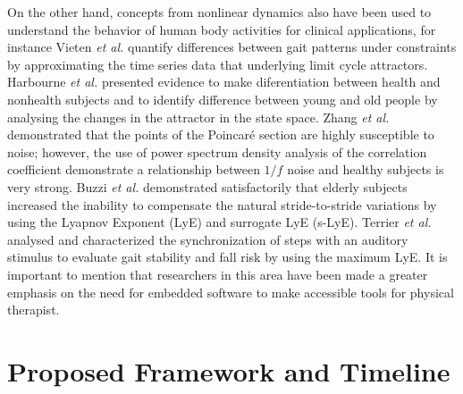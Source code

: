 \documentclass{sigchi}
\begin{document}
On the other hand, concepts from nonlinear dynamics also have been used to understand 
the behavior of human body activities for clinical applications, for instance
Vieten \emph{et al.} \cite{Vieten2013} quantify differences between gait patterns 
under constraints by approximating the time series data that underlying limit cycle 
attractors. 
Harbourne \emph{et al.} \cite{Harbourne2009} presented evidence 
to make diferentiation between health and nonhealth subjects and 
to identify difference between young and old people 
by analysing the changes in the attractor in the state space.
Zhang \textit{et al.} \cite{Zhang2010} demonstrated that the points of the 
Poincar\'e section are highly susceptible to noise; however, the use of power 
spectrum density analysis of the correlation coefficient demonstrate a relationship 
between $1/f$ noise and healthy subjects is very strong.
Buzzi \textit{et al.} \cite{Buzzi2003} demonstrated satisfactorily that elderly 
subjects increased the inability to compensate the natural stride-to-stride variations
by using the Lyapnov Exponent (LyE) and surrogate LyE (s-LyE).
Terrier \textit{et al.} \cite{Terrier2013} analysed and characterized the 
synchronization of steps with an auditory stimulus to evaluate gait stability 
and fall risk by using the maximum LyE.
It is important to mention that researchers in this area have been made 
a greater emphasis on the need for embedded software to make accessible 
tools for physical therapist.


\section{Proposed Framework and Timeline}
\end{document}
